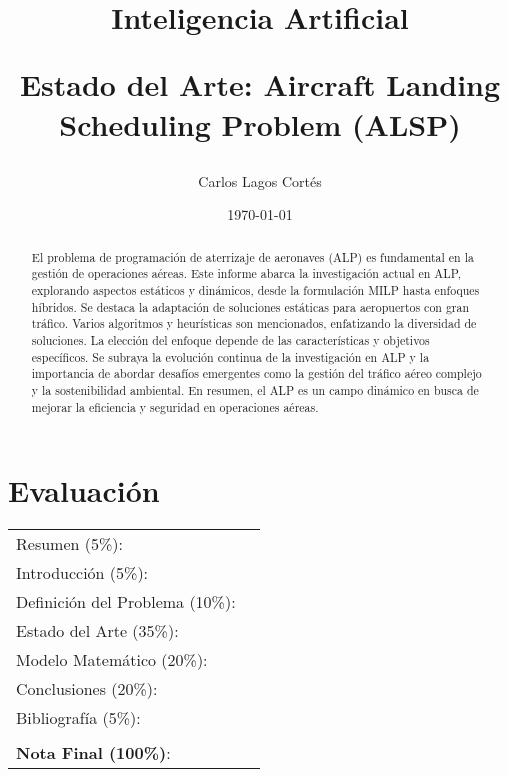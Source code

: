 \documentclass[letter, 10pt]{article}
\begin{document}
\title{Inteligencia Artificial \\ \begin{Large}Estado del Arte: Aircraft Landing Scheduling Problem (ALSP)\end{Large}}
\author{Carlos Lagos Cort\'es}
\date{\today}
\maketitle


\section*{Evaluaci\'on}

\begin{tabular}{ll}
Resumen (5\%): & \underline{\hspace{2cm}} \\
Introducci\'on (5\%):  & \underline{\hspace{2cm}} \\
Definici\'on del Problema (10\%):  & \underline{\hspace{2cm}} \\
Estado del Arte (35\%):  & \underline{\hspace{2cm}} \\
Modelo Matem\'atico (20\%): &  \underline{\hspace{2cm}}\\
Conclusiones (20\%): &  \underline{\hspace{2cm}}\\
Bibliograf\'ia (5\%): & \underline{\hspace{2cm}}\\
 &  \\
\textbf{Nota Final (100\%)}:   & \underline{\hspace{2cm}}
\end{tabular}
\vspace{2cm}


\begin{abstract}
El problema de programaci\'on de aterrizaje de aeronaves (ALP) es fundamental en la gesti\'on de operaciones a\'ereas. Este informe abarca la investigaci\'on actual en ALP, explorando aspectos est\'aticos y din\'amicos, desde la formulaci\'on MILP hasta enfoques h\'ibridos. Se destaca la adaptaci\'on de soluciones est\'aticas para aeropuertos con gran tr\'afico. Varios algoritmos y heur\'isticas son mencionados, enfatizando la diversidad de soluciones. La elecci\'on del enfoque depende de las caracter\'isticas y objetivos espec\'ificos. Se subraya la evoluci\'on continua de la investigaci\'on en ALP y la importancia de abordar desaf\'ios emergentes como la gesti\'on del tr\'afico a\'ereo complejo y la sostenibilidad ambiental. En resumen, el ALP es un campo din\'amico en busca de mejorar la eficiencia y seguridad en operaciones a\'ereas.
\end{abstract}
\end{document}
